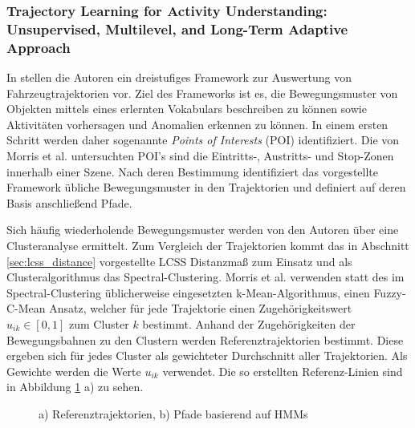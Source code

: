 \subsubsection*{Trajectory Learning for Activity Understanding: Unsupervised, Multilevel, and Long-Term Adaptive Approach}

In \cite[]{Morris2011} stellen die Autoren ein dreistufiges Framework zur Auswertung von Fahrzeugtrajektorien vor.
Ziel des Frameworks ist es, die Bewegungsmuster von Objekten mittels eines erlernten Vokabulars beschreiben zu können
sowie Aktivitäten vorhersagen und Anomalien erkennen zu können.
In einem ersten Schritt werden daher sogenannte \textit{Points of Interests} (POI) identifiziert. Die von Morris
et al. untersuchten POI's sind die Eintritts-, Austritts- und Stop-Zonen innerhalb einer Szene.
Nach deren Bestimmung identifiziert das vorgestellte Framework übliche Bewegungsmuster in den Trajektorien
und definiert auf deren Basis anschließend Pfade.

Sich häufig wiederholende Bewegungsmuster werden von den Autoren über eine Clusteranalyse ermittelt.
Zum Vergleich der Trajektorien kommt das in Abschnitt \ref{sec:lcss_distance} vorgestellte LCSS Distanzmaß zum Einsatz
und als Clusteralgorithmus das Spectral-Clustering. Morris et al. verwenden statt des im Spectral-Clustering
üblicherweise eingesetzten k-Mean-Algorithmus, einen Fuzzy-C-Mean Ansatz, welcher für jede Trajektorie
einen Zugehörigkeitswert $u_{ik} \in [0, 1]$ zum Cluster $k$ bestimmt.
Anhand der Zugehörigkeiten der Bewegungsbahnen zu den Clustern werden Referenztrajektorien bestimmt.
Diese ergeben sich für jedes Cluster als gewichteter Durchschnitt aller Trajektorien. Als Gewichte
werden die Werte $u_{ik}$ verwendet. Die so erstellten Referenz-Linien sind in Abbildung
\ref{fig:relw_morris_results} a) zu sehen.

\begin{figure}[H]
    \centering
    \qquad
    \caption[Referenztrajektorien und Pfade (Morris et al.)]{a) Referenztrajektorien, b) Pfade basierend auf HMMs \cite[]{Morris2011}}
    \label{fig:relw_morris_results}
\end{figure}

